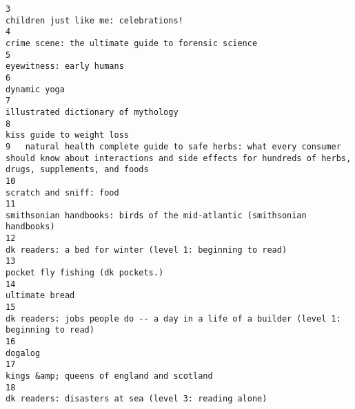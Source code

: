 \documentclass[
]{report}
\begin{document}
\begin{verbatim}
3                                                                                                                                    children just like me: celebrations!
4                                                                                                                     crime scene: the ultimate guide to forensic science
5                                                                                                                                                eyewitness: early humans
6                                                                                                                                                            dynamic yoga
7                                                                                                                                     illustrated dictionary of mythology
8                                                                                                                                               kiss guide to weight loss
9   natural health complete guide to safe herbs: what every consumer should know about interactions and side effects for hundreds of herbs, drugs, supplements, and foods
10                                                                                                                                                scratch and sniff: food
11                                                                                               smithsonian handbooks: birds of the mid-atlantic (smithsonian handbooks)
12                                                                                                              dk readers: a bed for winter (level 1: beginning to read)
13                                                                                                                                       pocket fly fishing (dk pockets.)
14                                                                                                                                                         ultimate bread
15                                                                                dk readers: jobs people do -- a day in a life of a builder (level 1: beginning to read)
16                                                                                                                                                                dogalog
17                                                                                                                             kings &amp; queens of england and scotland
18                                                                                                                  dk readers: disasters at sea (level 3: reading alone)

\end{verbatim}
\end{document}
